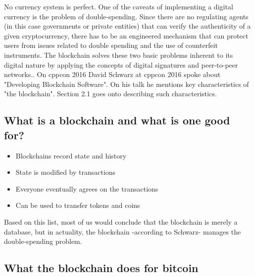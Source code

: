 \documentclass[submission,copyright,creativecommons]{eptcs}
\begin{document}
No currency system is perfect. One of the caveats of implementing a digital currency is the problem of double-spending.  Since there are no regulating agents (in this case governments or private entities) that can verify the authenticity of a given cryptocurrency, there has to be an engineered mechanism that can protect users from issues related to double spending and the use of counterfeit instruments. The blockchain solves these two basic problems inherent to its digital nature by applying the concepts of digital signatures and peer-to-peer networks.\cite{nakamotoBitcoinPeertoPeerElectronic}\cite{noauthor_bitcoin}.
On cppcon 2016 David Schwarz\cite{cppconCppCon2016David} at cppcon 2016 spoke about "Developing Blockchain Software".  On his talk he mentions key characteristics of "the blockchain". Section 2.1 goes onto describing such characteristics.   

\subsection{What is a blockchain and what is one good for?}
\begin{itemize}
\item Blockchains record state and history
\item State is modified by transactions
\item Everyone eventually agrees on the transactions
\item Can be used to transfer tokens and coins
\end{itemize}

Based on this list, most of us would conclude that the blockchain is merely a database, but in actuality, the blockchain -according to Schwarz\cite{cppconCppCon2016David}- manages the double-spending problem.

\subsection{What the blockchain does for bitcoin}
\end{document}
